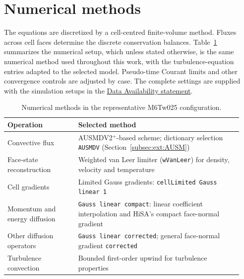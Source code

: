 \section{Numerical methods}
\label{sec:numerical-framework:discretization}

The equations are discretized by a cell-centred finite-volume method.
Fluxes across cell faces determine the discrete conservation balances.
Table~\ref{tab:numerical-framework:schemes} summarizes the numerical setup, which
unless stated otherwise, is the same numerical method used throughout this
work, with the turbulence-equation entries adapted to the selected model.
Pseudo-time Courant limits and other convergence controls are adjusted by
case. The complete settings are supplied with the simulation setups in the
\hyperref[chap:data-avail]{Data Availability statement}.

\begin{table}[htbp]
    \centering
    \small
    \caption{Numerical methods in the representative M6Tw025 configuration.}
    \label{tab:numerical-framework:schemes}
    \begin{tabular}{@{}p{0.29\linewidth}p{0.65\linewidth}@{}}
        \toprule
        Operation & Selected method \\
        \midrule
        Convective flux & AUSMDV2\(^+\)-based scheme;
            dictionary selection \texttt{AUSMDV}
            (Section~\ref{subsec:ext:AUSM}) \\
        Face-state reconstruction & Weighted van Leer limiter
            (\texttt{wVanLeer}) for density, velocity and temperature \\
        Cell gradients & Limited Gauss gradients:
            \texttt{cellLimited Gauss linear 1} \\
        Momentum and energy diffusion & \texttt{Gauss linear compact}:
            linear coefficient interpolation and HiSA's compact
            face-normal gradient \\
        Other diffusion operators & \texttt{Gauss linear corrected};
            general face-normal gradient \texttt{corrected} \\
        Turbulence convection & Bounded first-order upwind for
            turbulence properties \\
        \bottomrule
    \end{tabular}
\end{table}

